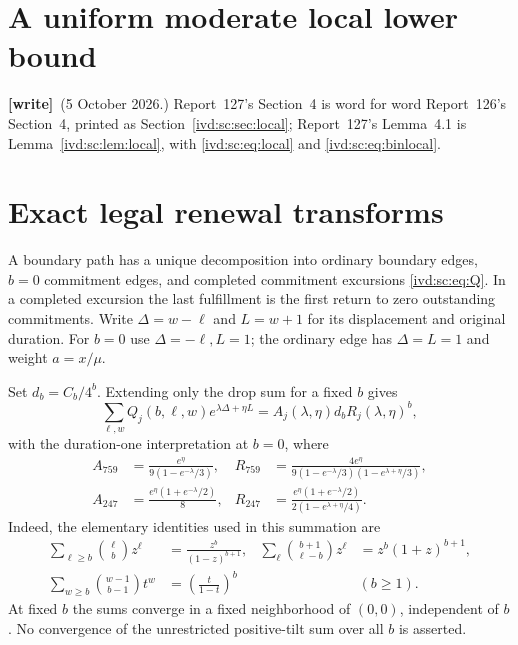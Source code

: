 \documentclass[11pt,letterpaper]{article}
\theoremstyle{remark}\newtheorem{remark}[theorem]{Remark}
\numberwithin{equation}{section}
\newcommand{\wtag}{\textup{\textbf{[write]}}}
\begin{document}
\section{A uniform moderate local lower bound}\label{ivd:sh:sec:local}
\wtag\ (5 October 2026.) Report~127's Section~4 is word for word Report~126's Section~4, printed as Section~\ref{ivd:sc:sec:local}; Report~127's Lemma~4.1 is Lemma~\ref{ivd:sc:lem:local}, with \eqref{ivd:sc:eq:local} and \eqref{ivd:sc:eq:binlocal}.

\section{Exact legal renewal transforms}\label{ivd:sh:sec:transforms}
A boundary path has a unique decomposition into ordinary boundary
edges, $b=0$ commitment edges, and completed commitment excursions
\eqref{ivd:sc:eq:Q}. In a completed excursion the last fulfillment is the
first return to zero outstanding commitments. Write $\Delta=w-\ell$
and $L=w+1$ for its displacement and original duration. For $b=0$
use $\Delta=-\ell,L=1$; the ordinary edge has $\Delta=L=1$ and
weight $a=x/\mu$.

Set $d_b=C_b/4^b$. Extending only the drop sum for a fixed $b$ gives
\begin{equation}\label{ivd:sh:eq:joint}
 \sum_{\ell,w}Q_j(b,\ell,w)e^{\lambda\Delta+\eta L}
 =A_j(\lambda,\eta)d_b R_j(\lambda,\eta)^b,
\end{equation}
with the duration-one interpretation at $b=0$, where
\begin{align}
 A_{759}&=\frac{e^\eta}{9(1-e^{-\lambda}/3)},&
 R_{759}&=\frac{4e^\eta}{9(1-e^{-\lambda}/3)(1-e^{\lambda+\eta}/3)},
 \label{ivd:sh:eq:trans759}\\
 A_{247}&=\frac{e^\eta(1+e^{-\lambda}/2)}8,&
 R_{247}&=\frac{e^\eta(1+e^{-\lambda}/2)}{2(1-e^{\lambda+\eta}/4)}.
 \label{ivd:sh:eq:trans247}
\end{align}
Indeed, the elementary identities used in this summation are
\begin{align*}
 \sum_{\ell\ge b}\binom\ell b z^\ell&=\frac{z^b}{(1-z)^{b+1}},&
 \sum_\ell\binom{b+1}{\ell-b}z^\ell&=z^b(1+z)^{b+1},\\
 \sum_{w\ge b}\binom{w-1}{b-1}t^w&=\left(\frac t{1-t}\right)^b
 &&(b\ge1).
\end{align*}
At fixed $b$ the sums converge in a fixed neighborhood of $(0,0)$,
independent of $b$. No convergence of the unrestricted positive-tilt
sum over all $b$ is asserted.
\end{document}
